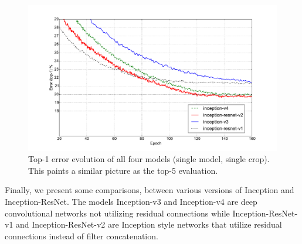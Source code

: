 \begin{figure}
\centering
\includegraphics[width=\linewidth]{all_top1}
\caption{Top-1 error evolution of all four models (single model, single crop).
  This paints a similar picture as the top-5 evaluation.
}
\label{fig:alltop1}
\end{figure}

Finally, we present some comparisons, between various versions of Inception
and Inception-ResNet. The models Inception-v3 and Inception-v4 are deep
convolutional networks not utilizing residual connections while
Inception-ResNet-v1 and Inception-ResNet-v2 are Inception style networks
that utilize residual connections instead of filter concatenation.

